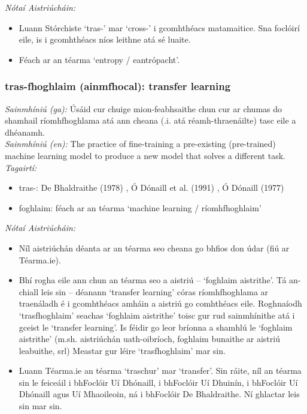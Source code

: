  \noindent \textit{Nótaí Aistriúcháin:}
\begin{itemize}
	\item Luann Stórchiste `tras-' mar `cross-' i gcomhthéacs matamaitice. Sna foclóirí eile, is i gcomhthéacs níos leithne atá sé luaite.
	\item Féach ar an téarma `entropy / eantrópacht'.
\end{itemize}


\subsubsection*{tras-fhoghlaim (ainmfhocal): transfer learning}
 \noindent \textit{Sainmhíniú (ga):} Úsáid cur chuige mion-feabhsaithe chun cur ar chumas do shamhail ríomhfhoghlama atá ann cheana (.i. atá réamh-thraenáilte) tasc eile a dhéanamh.
\\
 \noindent \textit{Sainmhíniú (en):} The practice of fine-training a pre-existing (pre-trained) machine learning model to produce a new model that solves a different task.
\\
 \noindent \textit{Tagairtí:}
\begin{itemize}
	\item tras-: De Bhaldraithe (1978) \cite{de-bhaldraithe}, Ó Dónaill et al. (1991) \cite{focloir-beag}, Ó Dónaill (1977) \cite{odonaill}
	\item foghlaim: féach ar an téarma `machine learning / ríomhfhoghlaim'
\end{itemize}

 \noindent \textit{Nótaí Aistriúcháin:}
\begin{itemize}
	\item Níl aistriúchán déanta ar an téarma seo cheana go bhfios don údar (fiú ar Téarma.ie).
	\item Bhí rogha eile ann chun an téarma seo a aistriú -- `foghlaim aistrithe'. Tá an-chiall leis sin -- déanann `transfer learning' córas ríomhfhoghlama ar traenáladh é i gcomhthéacs amháin a aistriú go comhthéacs eile. Roghnaíodh `trasfhoghlaim' seachas `foghlaim aistrithe' toisc gur rud sainmhínithe atá i gceist le `transfer learning'. Is féidir go leor bríonna a shamhlú le `foghlaim aistrithe' (m.sh. aistriúchán uath-oibríoch, foghlaim bunaithe ar aistriú leabuithe, srl) Meastar gur léire `trasfhoghlaim' mar sin.
	\item Luann Téarma.ie an téarma `traschur' mar `transfer'. Sin ráite, níl an téarma sin le feiceáil i bhFoclóir Uí Dhónaill, i bhFoclóir Uí Dhuinín, i bhFoclóir Uí Dhónaill agus Uí Mhaoileoin, ná i bhFoclóir De Bhaldraithe. Ní ghlactar leis sin mar sin.
\end{itemize}


